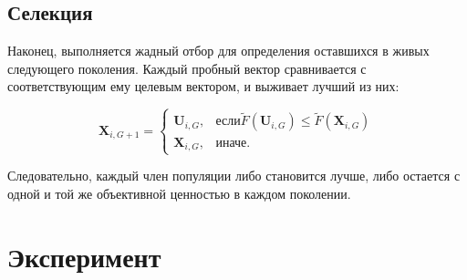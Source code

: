 \subsection{Селекция}

Наконец, выполняется жадный отбор для определения оставшихся в живых следующего поколения. Каждый пробный вектор сравнивается с соответствующим ему целевым вектором, и выживает лучший из них:

\begin{equation}\label{eq:de_sel}
  \textbf{X}_{i,G+1} =
  \begin{cases}
    \textbf{U}_{i,G}, & \mbox{если} \tilde{F}(\textbf{U}_{i,G}) \leq \tilde{F}(\textbf{X}_{i,G}) \\
    \textbf{X}_{i,G}, & \mbox{иначе}.
  \end{cases}
\end{equation}

Следовательно, каждый член популяции либо становится лучше, либо остается с одной и той же объективной ценностью в каждом поколении.

\section{Эксперимент}

